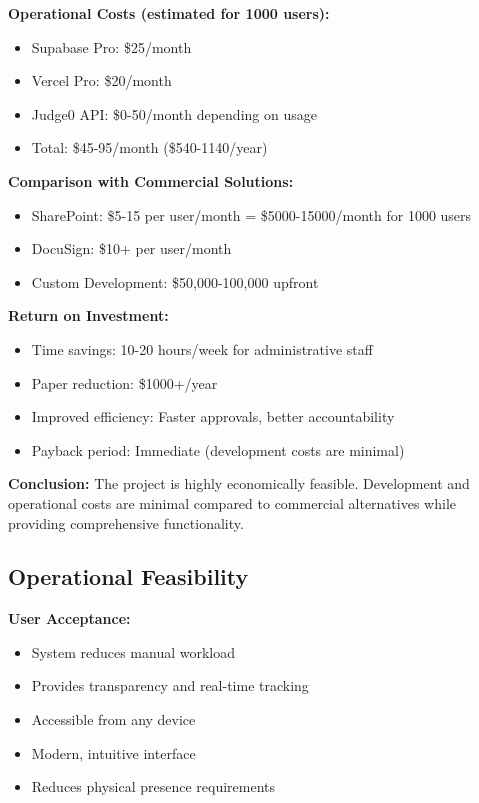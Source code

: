 \textbf{Operational Costs (estimated for 1000 users):}
\begin{itemize}
\item Supabase Pro: \$25/month
\item Vercel Pro: \$20/month
\item Judge0 API: \$0-50/month depending on usage
\item Total: \$45-95/month (\$540-1140/year)
\end{itemize}

\textbf{Comparison with Commercial Solutions:}
\begin{itemize}
\item SharePoint: \$5-15 per user/month = \$5000-15000/month for 1000 users
\item DocuSign: \$10+ per user/month
\item Custom Development: \$50,000-100,000 upfront
\end{itemize}

\textbf{Return on Investment:}
\begin{itemize}
\item Time savings: 10-20 hours/week for administrative staff
\item Paper reduction: \$1000+/year
\item Improved efficiency: Faster approvals, better accountability
\item Payback period: Immediate (development costs are minimal)
\end{itemize}

\textbf{Conclusion:} The project is highly economically feasible. Development and operational costs are minimal compared to commercial alternatives while providing comprehensive functionality.

\subsection{Operational Feasibility}

\textbf{User Acceptance:}
\begin{itemize}
\item System reduces manual workload
\item Provides transparency and real-time tracking
\item Accessible from any device
\item Modern, intuitive interface
\item Reduces physical presence requirements
\end{itemize}

